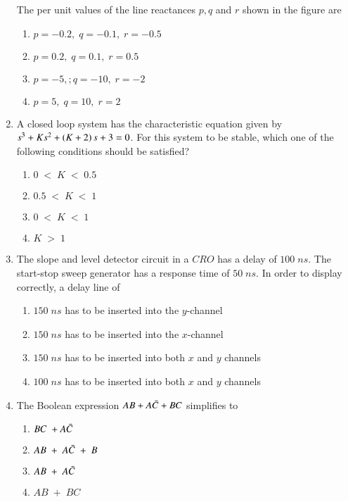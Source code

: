 \documentclass[journal,12pt,onecolumn]{IEEEtran}
\theoremstyle{remark}
\begin{document}
\begin{enumerate}
	
The per unit values of the line reactances $p,q$ and $r$ shown in the figure are
\begin{enumerate}
    \item $p=-0.2,\;q=-0.1,\;r=-0.5$
    \item $p=0.2,\;q=0.1,\;r=0.5$
    \item $p=-5,;q=-10,\;r=-2$
    \item $p=5,\;q=10,\;r=2$
\end{enumerate}
\item A closed loop system has the characteristic equation given by $s^3+Ks^2+\left(K+2\right)s+3=0$. For this system to be stable, which one of the following conditions should be satisfied?
\begin{enumerate}
    \item $0\;<\;K\;<\;0.5$
    \item $0.5\;<\;K\;<\;1$
    \item $0\;<\;K\;<\;1$
    \item $K\;>\;1$
\end{enumerate}
\item The slope and level detector circuit in a $CRO$ has a delay of $100\;ns$. The start-stop sweep generator has a response time of $50\;ns$. In order to display correctly, a delay line of 
\begin{enumerate}
    \item $150\;ns$ has to be inserted into the $y$-channel
    \item $150\;ns$ has to be inserted into the $x$-channel
    \item $150\;ns$ has to be inserted into both $x$ and $y$ channels
    \item $100\;ns$ has to be inserted into both $x$ and $y$ channels
\end{enumerate}
\item The Boolean expression $AB+A\Bar{C}+BC$ simplifies to 
\begin{enumerate}
    \item $BC\;+A\Bar{C}$
    \item $AB\;+\;A\Bar{C}\;+\;B$
    \item $AB\;+\;A\Bar{C}$
    \item $AB\;+\;BC$
\end{enumerate}

\end{enumerate}
\end{document}
